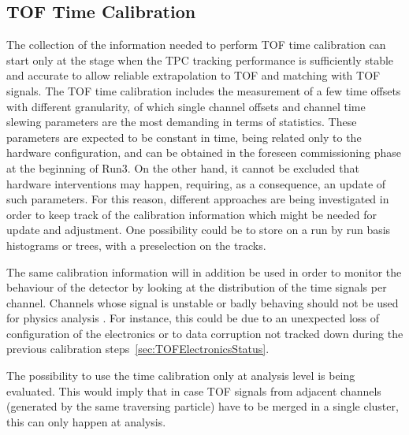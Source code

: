 \subsection{TOF Time Calibration}
\label{sec:TOFTimeCalibration}
The collection of the information needed to perform TOF time calibration 
can start only at the stage when the TPC tracking performance is sufficiently stable and accurate to allow
reliable extrapolation to TOF and matching with TOF signals. The TOF time calibration includes the measurement
of a few time offsets with different granularity, of which single channel offsets and channel time slewing parameters are 
the most demanding in terms of statistics. These parameters are expected to be constant in time, being related only
to the hardware configuration, and can be obtained in the foreseen commissioning phase at the beginning of Run3. 
On the other hand, it cannot be excluded that hardware interventions may happen, requiring, as a consequence, 
an update of such parameters. For this reason, different approaches are being investigated in order to keep 
track of the calibration information which might be needed for update and adjustment. One possibility could be 
to store on a run by run basis histograms or trees, with a preselection on the tracks. 

The same calibration information will in addition be used in order to monitor the behaviour of the detector
by looking at the distribution of the time signals per channel. Channels whose signal is unstable or 
badly behaving should not be used for physics analysis . For instance, this could be due to an unexpected 
loss of configuration of the electronics or to data corruption not tracked down during the previous calibration 
steps~\ref{sec:TOFElectronicsStatus}.

The possibility to use the time calibration only at analysis level is being evaluated. This would imply that in case TOF
signals from adjacent channels (generated by the same traversing particle) have to be merged in a single
cluster, this can only happen at analysis. 

